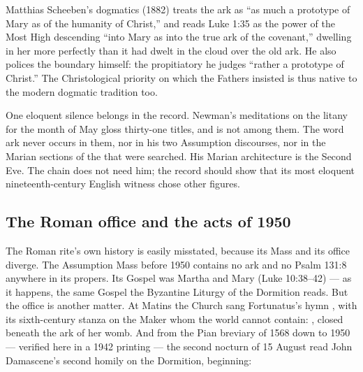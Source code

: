Matthias Scheeben's dogmatics (1882) treats the ark as ``as much a prototype
of Mary as of the humanity of Christ,'' and reads Luke 1:35 as the power of
the Most High descending ``into Mary as into the true ark of the covenant,''
dwelling in her more perfectly than it had dwelt in the cloud over the old
ark. He also polices the boundary himself: the propitiatory he judges
``rather a prototype of Christ.'' The Christological priority on which the
Fathers insisted is thus native to the modern dogmatic tradition too.

One eloquent silence belongs in the record. Newman's meditations on the
litany for the month of May gloss thirty-one titles, and  is not among them. The word ark never occurs in them, nor in his two
Assumption discourses, nor in the Marian sections of the  that were searched. His Marian architecture is the Second Eve. The
chain does not need him; the record should show that its most eloquent
nineteenth-century English witness chose other
figures.

\subsection{The Roman office and the acts of 1950}

The Roman rite's own history is easily misstated, because its Mass and its
office diverge. The Assumption Mass before 1950 contains no ark and no Psalm
131:8 anywhere in its propers. Its Gospel was Martha and Mary (Luke
10:38--42) --- as it happens, the same Gospel the Byzantine Liturgy of the
Dormition reads. But the office is another matter. At Matins the Church sang
Fortunatus's hymn , with its sixth-century
stanza on the Maker whom the world cannot contain: , closed beneath the ark of her womb. And from the Pian breviary
of 1568 down to 1950 --- verified here in a 1942 printing --- the second
nocturn of 15 August read John Damascene's second homily on the Dormition,
beginning:

